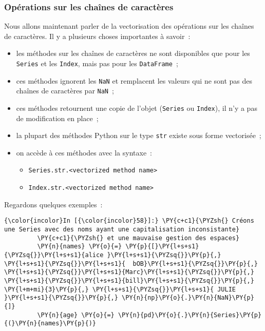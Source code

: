     \hypertarget{opuxe9rations-sur-les-chauxeenes-de-caractuxe8res}{%
\subsubsection{Opérations sur les chaînes de
caractères}\label{opuxe9rations-sur-les-chauxeenes-de-caractuxe8res}}

    Nous allons maintenant parler de la vectorisation des opérations sur les
chaînes de caractères. Il y a plusieurs choses importantes à savoir~:

\begin{itemize}
\tightlist
\item
  les méthodes sur les chaînes de caractères ne sont disponibles que
  pour les \texttt{Series} et les \texttt{Index}, mais pas pour les
  \texttt{DataFrame}~;
\item
  ces méthodes ignorent les \texttt{NaN} et remplacent les valeurs qui
  ne sont pas des chaînes de caractères par \texttt{NaN}~;
\item
  ces méthodes retournent une copie de l'objet (\texttt{Series} ou
  \texttt{Index}), il n'y a pas de modification en place~;
\item
  la plupart des méthodes Python sur le type \texttt{str} existe sous
  forme vectorisée~;
\item
  on accède à ces méthodes avec la syntaxe~:

  \begin{itemize}
  \tightlist
  \item
    \texttt{Series.str.\textless{}vectorized\ method\ name\textgreater{}}
  \item
    \texttt{Index.str.\textless{}vectorized\ method\ name\textgreater{}}
  \end{itemize}
\end{itemize}

Regardons quelques exemples~:

    \begin{Verbatim}[commandchars=\\\{\},frame=single,framerule=0.3mm,rulecolor=\color{cellframecolor}]
{\color{incolor}In [{\color{incolor}58}]:} \PY{c+c1}{\PYZsh{} Créons une Series avec des noms ayant une capitalisation inconsistante}
         \PY{c+c1}{\PYZsh{} et une mauvaise gestion des espaces}
         \PY{n}{names} \PY{o}{=} \PY{p}{[}\PY{l+s+s1}{\PYZsq{}}\PY{l+s+s1}{alice }\PY{l+s+s1}{\PYZsq{}}\PY{p}{,} \PY{l+s+s1}{\PYZsq{}}\PY{l+s+s1}{  bOB}\PY{l+s+s1}{\PYZsq{}}\PY{p}{,} \PY{l+s+s1}{\PYZsq{}}\PY{l+s+s1}{Marc}\PY{l+s+s1}{\PYZsq{}}\PY{p}{,} \PY{l+s+s1}{\PYZsq{}}\PY{l+s+s1}{bill}\PY{l+s+s1}{\PYZsq{}}\PY{p}{,} \PY{l+m+mi}{3}\PY{p}{,} \PY{l+s+s1}{\PYZsq{}}\PY{l+s+s1}{ JULIE }\PY{l+s+s1}{\PYZsq{}}\PY{p}{,} \PY{n}{np}\PY{o}{.}\PY{n}{NaN}\PY{p}{]}
         \PY{n}{age} \PY{o}{=} \PY{n}{pd}\PY{o}{.}\PY{n}{Series}\PY{p}{(}\PY{n}{names}\PY{p}{)}
\end{Verbatim}


